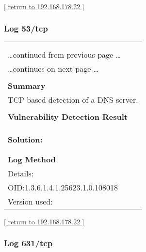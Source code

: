 \documentclass{article}
\begin{document}
\begin{footnotesize}\hyperref[host:192.168.178.22]{[ return to 192.168.178.22 ]}\end{footnotesize}
\subsubsection{Log 53/tcp}
\label{port:192.168.178.22 53/tcp Log}

\begin{longtable}{|p{}|}
\hline
\rowcolor{gvm_log}{\color{white}{Log (CVSS: 0.0) }}\\
\rowcolor{gvm_log}{\color{white}{NVT: DNS Server Detection (TCP)}}\\
\hline
\endfirsthead
\hfill\ldots continued from previous page \ldots \\
\hline
\endhead
\hline
\ldots continues on next page \ldots \\
\endfoot
\hline
\endlastfoot
\\
\textbf{Summary}\\
TCP based detection of a DNS server.\\

        \hline
        \\
\textbf{Vulnerability Detection Result}\\
\rowcolor{white}{\verb=The remote DNS server banner is:=}\\
\rowcolor{white}{\verb=unbound 1.15.0=}\\

          \hline
          \\
\textbf{Solution:}\\
\\


        \hline
        \\
\textbf{Log Method}\\
Details:
\rowcolor{white}{\verb=DNS Server Detection (TCP)=}\\
OID:1.3.6.1.4.1.25623.1.0.108018\\
Version used:
\rowcolor{white}{\verb=2021-11-30T08:05:58Z=}\\
\end{longtable}

\begin{footnotesize}\hyperref[host:192.168.178.22]{[ return to 192.168.178.22 ]}\end{footnotesize}
\subsubsection{Log 631/tcp}
\label{port:192.168.178.22 631/tcp Log}
\end{document}
